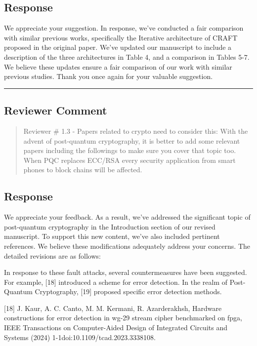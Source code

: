 \subsection{Response}

We appreciate your suggestion. In response, we've conducted a fair comparison with similar previous works, specifically the Iterative architecture of CRAFT proposed in the original paper. We've updated our manuscript to include a description of the three architectures in Table 4, and a comparison in Tables 5-7. We believe these updates ensure a fair comparison of our work with similar previous studies. Thank you once again for your valuable suggestion.



\noindent\rule{\linewidth}{2.0pt}

\subsection{Reviewer Comment}
\begin{mdframed}
	\begin{quote}
		Reviewer \# 1.3 - Papers related to crypto need to consider this: With the advent of post-quantum cryptography, it is better to add some relevant papers including the followings to make sure you cover that topic too. When PQC replaces ECC/RSA every security application from smart phones to block chains will be affected.
	\end{quote}
\end{mdframed}

\subsection{Response}

We appreciate your feedback. As a result, we've addressed the significant topic of post-quantum cryptography in the Introduction section of our revised manuscript. To support this new content, we've also included pertinent references. We believe these modifications adequately address your concerns. The detailed revisions are as follows:


\color{blue}

In response to these fault attacks, several countermeasures have been suggested. For example, [18] introduced a scheme for error detection. In the realm of Post-Quantum Cryptography, [19] proposed specific error detection methods.

	[18] J. Kaur, A. C. Canto, M. M. Kermani, R. Azarderakhsh, Hardware constructions for error detection in wg-29 stream cipher benchmarked on fpga, IEEE Transactions on Computer-Aided Design of Integrated Circuits and Systems (2024) 1-1doi:10.1109/tcad.2023.3338108.

